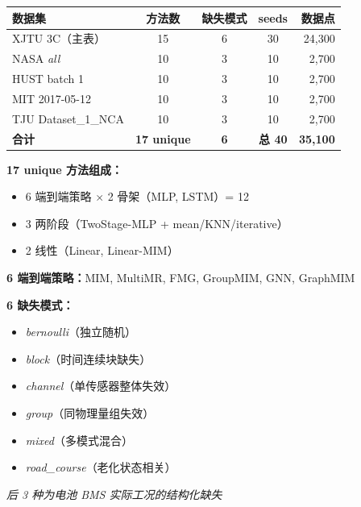 \documentclass[11pt,a4paper,landscape]{ctexart}
\begin{document}
\vspace{1em}
\begin{table}[H]
\centering
\Large
\begin{tabular}{@{}p{6.5cm}ccc r@{}}
\toprule
\textbf{数据集} & \textbf{方法数} & \textbf{缺失模式} & \textbf{seeds} & \textbf{数据点} \\
\midrule
XJTU 3C（主表）& 15 & 6 & 30 & 24{,}300 \\
\midrule
NASA \emph{all}         & 10 & 3 & 10 & 2{,}700 \\
HUST batch 1            & 10 & 3 & 10 & 2{,}700 \\
MIT 2017-05-12          & 10 & 3 & 10 & 2{,}700 \\
TJU Dataset\_1\_NCA     & 10 & 3 & 10 & 2{,}700 \\
\midrule
\textbf{合计} & \textbf{17 unique} & \textbf{6} & \textbf{总 40} & \textbf{35{,}100} \\
\bottomrule
\end{tabular}
\end{table}

\vspace{2em}
\begin{minipage}[t]{0.48\textwidth}
\normalsize
\textbf{17 unique 方法组成：}
\begin{itemize}[leftmargin=1.2em, itemsep=1pt]
    \item 6 端到端策略 $\times$ 2 骨架（MLP, LSTM）= 12
    \item 3 两阶段（TwoStage-MLP + mean/KNN/iterative）
    \item 2 线性（Linear, Linear-MIM）
\end{itemize}
\textbf{6 端到端策略：}MIM, MultiMR, FMG, GroupMIM, GNN, GraphMIM
\end{minipage}\hfill
\begin{minipage}[t]{0.48\textwidth}
\normalsize
\textbf{6 缺失模式：}
\begin{itemize}[leftmargin=1.2em, itemsep=1pt]
    \item \emph{bernoulli}（独立随机）
    \item \emph{block}（时间连续块缺失）
    \item \emph{channel}（单传感器整体失效）
    \item \emph{group}（同物理量组失效）
    \item \emph{mixed}（多模式混合）
    \item \emph{road\_course}（老化状态相关）
\end{itemize}
\emph{后 3 种为电池 BMS 实际工况的结构化缺失}
\end{minipage}
\end{document}
